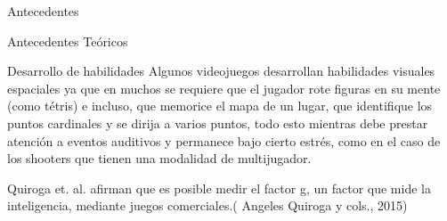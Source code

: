 \begin{section}{Antecedentes}
\begin{subsection}{Antecedentes Teóricos}
    \begin{subsubsection}{Desarrollo de habilidades}
      Algunos videojuegos desarrollan habilidades visuales espaciales ya que en muchos se requiere que el jugador rote figuras en su mente (como tétris) e incluso, que memorice el mapa de un lugar, que identifique los puntos cardinales y se dirija a varios puntos, todo esto mientras debe prestar atención a eventos auditivos y permanece bajo cierto estrés, como en el caso de los shooters que tienen una modalidad de multijugador. 

      Quiroga et. al. afirman que es posible medir el factor g, un factor que mide la inteligencia, mediante juegos comerciales.( Angeles Quiroga y cols., 2015)
    \end{subsubsection}    
  \end{subsection}
\end{section}
